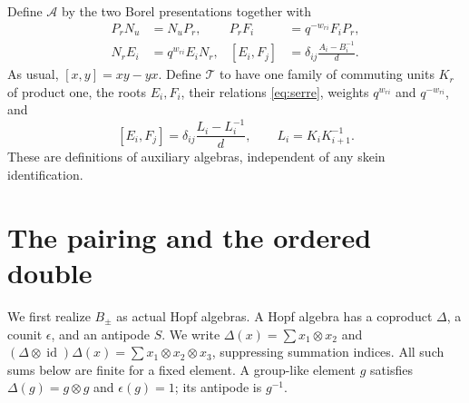 \documentclass[11pt]{article}
\theoremstyle{definition}
\theoremstyle{remark}
\newcommand{\id}{\operatorname{id}}
\newcommand{\cA}{\mathcal{A}}
\newcommand{\cT}{\mathcal{T}}
\begin{document}
Define $\cA$ by the two Borel presentations together with
\begin{equation}\label{eq:mixed}
 \begin{aligned}
 P_rN_u&=N_uP_r,& P_rF_i&=q^{-w_{ri}}F_iP_r,\\
 N_rE_i&=q^{w_{ri}}E_iN_r,&
 [E_i,F_j]&=\delta_{ij}\frac{A_i-B_i^{-1}}d.
 \end{aligned}
\end{equation}
As usual, $[x,y]=xy-yx$. Define $\cT$ to have one family of commuting units $K_r$ of product one, the roots $E_i,F_i$, their relations \eqref{eq:serre}, weights $q^{w_{ri}}$ and $q^{-w_{ri}}$, and
\begin{equation}\label{eq:single-commutator}
 [E_i,F_j]=\delta_{ij}\frac{L_i-L_i^{-1}}d,
 \qquad L_i=K_iK_{i+1}^{-1}.
\end{equation}
These are definitions of auxiliary algebras, independent of any skein identification.

\section{The pairing and the ordered double}\label{sec:double}

We first realize $B_\pm$ as actual Hopf algebras. A Hopf algebra has a coproduct $\Delta$, a counit $\epsilon$, and an antipode $S$. We write $\Delta(x)=\sum x_1\otimes x_2$ and $(\Delta\otimes\id)\Delta(x)=\sum x_1\otimes x_2\otimes x_3$, suppressing summation indices. All such sums below are finite for a fixed element. A group-like element $g$ satisfies $\Delta(g)=g\otimes g$ and $\epsilon(g)=1$; its antipode is $g^{-1}$.
\end{document}
